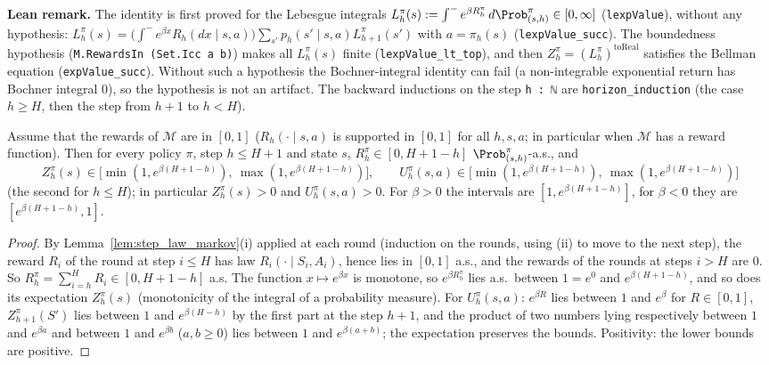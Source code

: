 \textbf{Lean remark.} The identity is first proved for the Lebesgue integrals
$L^\pi_h(s) := \int^- e^{\beta R^\pi_h}\,d\Prob^\pi_{(s,h)} \in [0, \infty]$ (\texttt{lexpValue}),
without any hypothesis: $L^\pi_h(s) = \big(\int^- e^{\beta x}R_h(dx \mid s, a)\big)\sum_{s'} p_h(s' \mid s, a)L^\pi_{h+1}(s')$
with $a = \pi_h(s)$ (\texttt{lexpValue\_succ}). The boundedness hypothesis
(\texttt{M.RewardsIn (Set.Icc a b)}) makes all $L^\pi_h(s)$ finite
(\texttt{lexpValue\_lt\_top}), and then $Z^\pi_h = (L^\pi_h)^{\mathrm{toReal}}$ satisfies the
Bellman equation (\texttt{expValue\_succ}). Without such a hypothesis the Bochner-integral
identity can fail (a non-integrable exponential return has Bochner integral $0$), so the
hypothesis is not an artifact. The backward inductions on the step \texttt{h : ℕ} are
\texttt{horizon\_induction} (the case $h \ge H$, then the step from $h + 1$ to $h < H$).

\begin{lemma}\label{lem:exp_value_range}
\leanok
{}
Assume that the rewards of $\mathcal M$ are in $[0, 1]$ ($R_h(\cdot \mid s, a)$ is supported in
$[0, 1]$ for all $h, s, a$; in particular when $\mathcal M$ has a reward function). Then for every
policy $\pi$, step $h \le H + 1$ and state $s$, $R^\pi_h \in [0, H + 1 - h]$
$\Prob^\pi_{(s, h)}$-a.s., and
\[
  Z^\pi_h(s) \in \big[\min(1, e^{\beta(H + 1 - h)}),\ \max(1, e^{\beta(H + 1 - h)})\big],
  \qquad
  U^\pi_h(s, a) \in \big[\min(1, e^{\beta(H + 1 - h)}),\ \max(1, e^{\beta(H + 1 - h)})\big]
\]
(the second for $h \le H$); in particular $Z^\pi_h(s) > 0$ and $U^\pi_h(s, a) > 0$. For
$\beta > 0$ the intervals are $[1, e^{\beta(H+1-h)}]$, for $\beta < 0$ they are
$[e^{\beta(H+1-h)}, 1]$.
\end{lemma}

\begin{proof}
\leanok
By Lemma~\ref{lem:step_law_markov}(i) applied at each round (induction on the rounds, using (ii)
to move to the next step), the reward $R_i$ of the round at step $i \le H$ has law
$R_i(\cdot \mid S_i, A_i)$, hence lies in $[0, 1]$ a.s., and the rewards of the rounds at
steps $i > H$ are $0$. So $R^\pi_h = \sum_{i = h}^H R_i \in [0, H + 1 - h]$ a.s. The function
$x \mapsto e^{\beta x}$ is monotone, so $e^{\beta R^\pi_h}$ lies a.s.\ between $1 = e^{0}$ and
$e^{\beta(H + 1 - h)}$, and so does its expectation $Z^\pi_h(s)$ (monotonicity of the integral of a
probability measure). For $U^\pi_h(s, a)$: $e^{\beta R}$ lies between $1$ and $e^\beta$ for
$R \in [0, 1]$, $Z^\pi_{h+1}(S')$ lies between $1$ and $e^{\beta(H - h)}$ by the first part at the
step $h + 1$, and the product of two numbers lying respectively between $1$ and $e^{\beta a}$
and between $1$ and $e^{\beta b}$ ($a, b \ge 0$) lies between $1$ and $e^{\beta(a + b)}$; the
expectation preserves the bounds. Positivity: the lower bounds are positive.
\end{proof}

